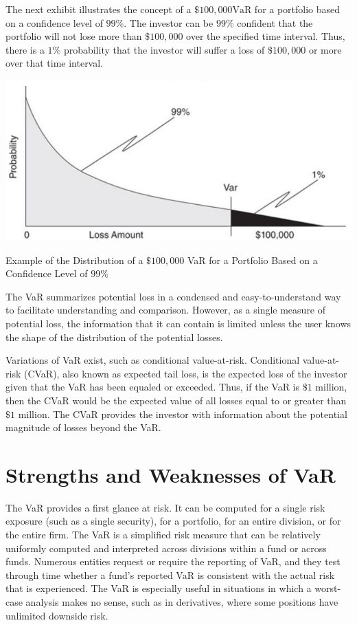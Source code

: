 \documentclass[11pt]{article}
\begin{document}
The next exhibit illustrates the concept of a $\$ 100,000 \mathrm{VaR}$ for a portfolio based on a confidence level of $99 \%$. The investor can be $99 \%$ confident that the portfolio will not lose more than $\$ 100,000$ over the specified time interval. Thus, there is a $1 \%$ probability that the investor will suffer a loss of $\$ 100,000$ or more over that time interval.

\begin{center}
\includegraphics[max width=\textwidth]{2024_04_11_f382ae991e4e475fea0dg-4}
\end{center}

Example of the Distribution of a $\$ 100,000$ VaR for a Portfolio Based on a Confidence Level of $99 \%$

The VaR summarizes potential loss in a condensed and easy-to-understand way to facilitate understanding and comparison. However, as a single measure of potential loss, the information that it can contain is limited unless the user knows the shape of the distribution of the potential losses.

Variations of VaR exist, such as conditional value-at-risk. Conditional value-at-risk (CVaR), also known as expected tail loss, is the expected loss of the investor given that the VaR has been equaled or exceeded. Thus, if the VaR is $\$ 1$ million, then the CVaR would be the expected value of all losses equal to or greater than $\$ 1$ million. The CVaR provides the investor with information about the potential magnitude of losses beyond the VaR.

\section*{Strengths and Weaknesses of VaR}
The VaR provides a first glance at risk. It can be computed for a single risk exposure (such as a single security), for a portfolio, for an entire division, or for the entire firm. The VaR is a simplified risk measure that can be relatively uniformly computed and interpreted across divisions within a fund or across funds. Numerous entities request or require the reporting of VaR, and they test through time whether a fund's reported VaR is consistent with the actual risk that is experienced. The VaR is especially useful in situations in which a worst-case analysis makes no sense, such as in derivatives, where some positions have unlimited downside risk.
\end{document}
